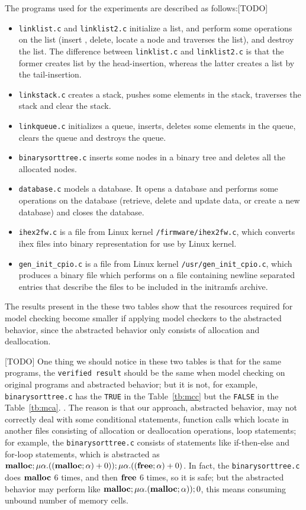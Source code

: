 The programs used for the experiments are described as follows:[TODO]
\begin{itemize}
\item \texttt{linklist.c} and \texttt{linklist2.c} initialize a list,
  and perform some operations on the list (insert , delete, locate a
  node and traverses the list), and destroy the list. The difference
  between \texttt{linklist.c} and \texttt{linklist2.c} is that the
  former creates list by the head-insertion, whereas the latter creates a list
  by the tail-insertion.
\item \texttt{linkstack.c} creates a stack, pushes some elements in
  the stack, traverses the stack and clear the stack.
\item \texttt{linkqueue.c} initializes a queue, inserts, deletes some
  elements in the queue, clears the queue and destroys the queue.
\item \texttt{binarysorttree.c} inserts some nodes in a binary tree
  and deletes all the allocated nodes.
\item \texttt{database.c} models a database. It opens a database and
  performs some operations on the database (retrieve, delete and
  update data, or create a new database) and closes the database.
\item \texttt{ihex2fw.c} is a file from Linux kernel
  \texttt{/firmware/ihex2fw.c}, which converts ihex files into binary
  representation for use by Linux kernel.
\item \texttt{gen\_init\_cpio.c} is a file from Linux kernel
  \texttt{/usr/gen\_init\_cpio.c}, which produces a binary file which
  performs on a file containing newline separated entries that
  describe the files to be included in the initramfs archive.
\end{itemize}

The results present in the these two tables show that the
resources required for model checking become smaller if applying model
checkers to the abstracted behavior, since the abstracted behavior
only consists of allocation and deallocation.

[TODO]
One thing we should notice in these two tables is that for the same
programs, the \texttt{verified result} should be the same when model
checking on original programs and abstracted behavior; but it is not,
for example, \texttt{binarysorttree.c} has the \texttt{TRUE} in the
Table~\ref{tb:mcc} but the \texttt{FALSE} in the Table~\ref{tb:mca}.
. The reason is that our approach, abstracted behavior, may not
correctly deal with some conditional statements, function calls which
locate in another files consisting of allocation or deallocation
operations, loop statements; for example, the
\texttt{binarysorttree.c} consists of statements like if-then-else and
for-loop statements, which is abstracted as
$\mathbf{malloc};\mu\alpha.((\mathbf{malloc};\alpha) + 0));\mu\alpha.((\mathbf{free};\alpha) +
0)$. In fact, the \texttt{binarysorttree.c} does $\mathbf{malloc}$ 6 times,
and then $\mathbf{free}$ 6 times, so it is safe; but the abstracted behavior
may perform like $\mathbf{malloc};\mu\alpha.(\mathbf{malloc};\alpha));0$, this means
consuming unbound number of memory cells.

